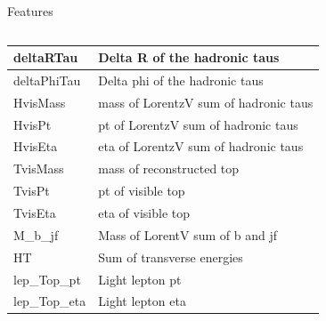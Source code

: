 \begin{frame}{Features}
\begin{columns}
\begin{column}{0.5\textwidth}
{\begin{tabular}{|l|l|}
                 deltaRTau        & Delta R of the hadronic taus          \\ \hline
                 deltaPhiTau      & Delta phi of the hadronic taus        \\ \hline
                 HvisMass         & mass of LorentzV sum of hadronic taus  \\ \hline
                 HvisPt           & pt of LorentzV sum of hadronic taus      \\ \hline
                 HvisEta          & eta of LorentzV sum of hadronic taus      \\ \hline
                 TvisMass         & mass of reconstructed top             \\ \hline
                 TvisPt           & pt of visible top                     \\ \hline
                 TvisEta          & eta of visible top                    \\ \hline
                 M\_b\_jf         & Mass of LorentV sum of b and jf       \\ \hline
                 HT               & Sum of transverse energies            \\ \hline
                 lep\_Top\_pt     & Light lepton pt                       \\ \hline
                 lep\_Top\_eta    & Light lepton eta                      \\ \hline
             \end{tabular}}
        \end{column}
    \end{columns}
\end{frame}

